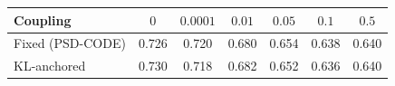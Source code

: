 \begin{tabular}{lcccccc}
\toprule
Coupling & $0$ & $0.0001$ & $0.01$ & $0.05$ & $0.1$ & $0.5$ \\
\midrule
Fixed (PSD-CODE) & 0.726 & 0.720 & 0.680 & 0.654 & 0.638 & 0.640 \\
KL-anchored & 0.730 & 0.718 & 0.682 & 0.652 & 0.636 & 0.640 \\
\bottomrule
\end{tabular}
